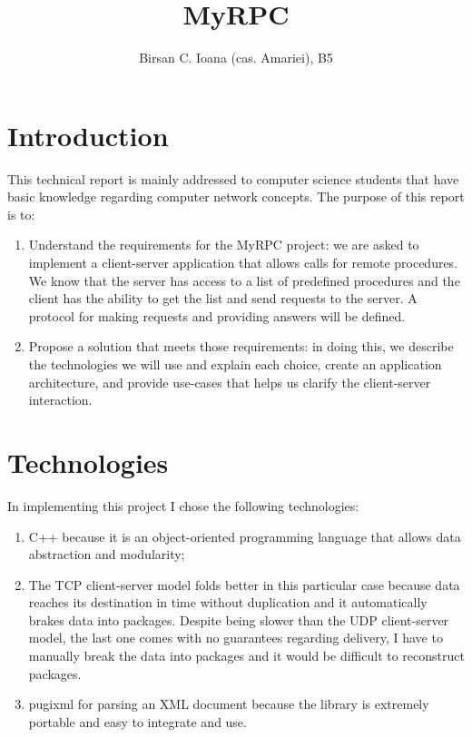 \documentclass{llncs}
\begin{document}
\setcounter{page}{1}
%
\frontmatter          %
%
\pagestyle{headings}  %


\title{MyRPC}
\author{Birsan C. Ioana (cas. Amariei), B5}

\maketitle

\section*{Introduction}
This technical report is mainly addressed to computer science students that have basic knowledge regarding computer network concepts. The purpose of this report is to:
\begin{enumerate}
\item Understand the requirements for the MyRPC project: we are asked to implement a client-server application that allows calls for remote procedures. We know that the server has access to a list of predefined procedures and the client has the ability to get the list and send requests to the server. A protocol for making requests and providing answers will be defined.
\item Propose a solution that meets those requirements: in doing this, we describe the technologies we will use and explain each choice, create an application architecture, and provide use-cases that helps us clarify the client-server interaction.
\end{enumerate}

\section*{Technologies}
In implementing this project I chose the following technologies: 
	\begin{enumerate}
		\item C++ because it is an object-oriented programming language that allows data abstraction and modularity; 
		\item The TCP client-server model folds better in this particular case because data reaches its destination in time without duplication and it automatically brakes data into packages.
		Despite being slower than the UDP client-server model, the last one comes with no guarantees regarding delivery, I have to manually break the data into packages and it would be difficult to reconstruct packages. 
		\item pugixml for parsing an XML document because the library is extremely portable and easy to integrate and use.
	\end{enumerate}
	
\end{document}
